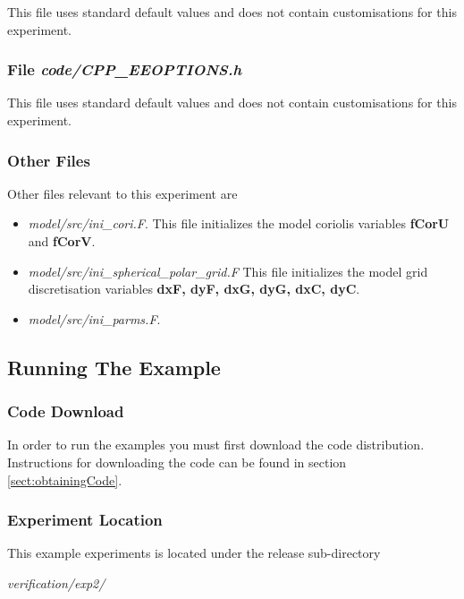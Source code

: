 This file uses standard default values and does not contain
customisations for this experiment.


\subsubsection{File {\it code/CPP\_EEOPTIONS.h}}
\label{www:tutorials}

This file uses standard default values and does not contain
customisations for this experiment.

\subsubsection{Other Files }
\label{www:tutorials}

Other files relevant to this experiment are
\begin{itemize}
\item {\it model/src/ini\_cori.F}. This file initializes the model
coriolis variables {\bf fCorU} and {\bf fCorV}.
\item {\it model/src/ini\_spherical\_polar\_grid.F} This file
initializes the model grid discretisation variables {\bf
dxF, dyF, dxG, dyG, dxC, dyC}.
\item {\it model/src/ini\_parms.F}.
\end{itemize}

\subsection{Running The Example}
\label{www:tutorials}
\label{SEC:running_the_example}

\subsubsection{Code Download}
\label{www:tutorials}

 In order to run the examples you must first download the code distribution.
Instructions for downloading the code can be found in section
\ref{sect:obtainingCode}.

\subsubsection{Experiment Location}
\label{www:tutorials}

 This example experiments is located under the release sub-directory

\vspace{5mm}
{\it verification/exp2/ }

